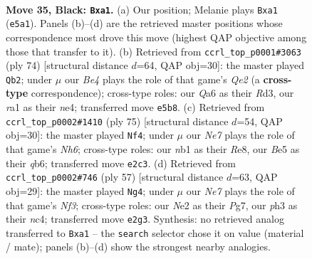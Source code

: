 \documentclass[11pt]{article}
\begin{document}
\clearpage

\begin{figure}[p]\centering
\begin{subfigure}{0.46\textwidth}\centering
\resizebox{\linewidth}{!}{%
\newchessgame
\chessboard[
  setfen={r5k1/1p3p2/q5p1/p2pb3/7p/7P/P3nPP1/RN1Q3K b - - 0 35},
  showmover=false,
  pgfstyle=straightmove, color=movearrow, markmove={e5-a1}
]}
\caption{}
\end{subfigure}\hfill
\begin{subfigure}{0.46\textwidth}\centering
\resizebox{\linewidth}{!}{%
\newchessgame
\chessboard[
  setfen={5r1k/p6p/4q3/3NPp2/4n3/1P1R2P1/P3Q2K/8 w - - 1 38},
  showmover=false,
  pgfstyle=straightmove, color=movearrow, markmove={e2-b2}
]}
\caption{}
\end{subfigure}
\\[4pt]
\begin{subfigure}{0.46\textwidth}\centering
\resizebox{\linewidth}{!}{%
\newchessgame
\chessboard[
  setfen={4r3/5pk1/PQp1q3/4p1p1/2P4p/1PB2P1n/K6R/8 b - - 0 38},
  showmover=false,
  pgfstyle=straightmove, color=movearrow, markmove={h3-f4}
]}
\caption{}
\end{subfigure}\hfill
\begin{subfigure}{0.46\textwidth}\centering
\resizebox{\linewidth}{!}{%
\newchessgame
\chessboard[
  setfen={1k6/1pq3p1/p1p2nQ1/8/PPN4r/7P/5PP1/2R4K b - - 2 29},
  showmover=false,
  pgfstyle=straightmove, color=movearrow, markmove={f6-g4}
]}
\caption{}
\end{subfigure}
\caption{\textbf{Move 35, Black: \texttt{Bxa1}.} (a) Our position; Melanie plays \texttt{Bxa1} (\texttt{e5a1}). Panels (b)--(d) are the retrieved master positions whose correspondence most drove this move (highest QAP objective among those that transfer to it). (b) Retrieved from \texttt{ccrl\_top\_p0001\#3063} (ply 74) [structural distance $d$=64, QAP obj=30]: the master played \texttt{Qb2}; under $\mu$ our \emph{Be4} plays the role of that game's \emph{Qe2} (a \textbf{cross-type} correspondence); cross-type roles: our \emph{Q}a6 as their \emph{R}d3, our \emph{r}a1 as their \emph{n}e4; transferred move \texttt{e5b8}. (c) Retrieved from \texttt{ccrl\_top\_p0002\#1410} (ply 75) [structural distance $d$=54, QAP obj=30]: the master played \texttt{Nf4}; under $\mu$ our \emph{Ne7} plays the role of that game's \emph{Nh6}; cross-type roles: our \emph{n}b1 as their \emph{R}e8, our \emph{B}e5 as their \emph{q}b6; transferred move \texttt{e2c3}. (d) Retrieved from \texttt{ccrl\_top\_p0002\#746} (ply 57) [structural distance $d$=63, QAP obj=29]: the master played \texttt{Ng4}; under $\mu$ our \emph{Ne7} plays the role of that game's \emph{Nf3}; cross-type roles: our \emph{N}e2 as their \emph{P}g7, our \emph{p}h3 as their \emph{n}c4; transferred move \texttt{e2g3}. Synthesis: no retrieved analog transferred to \texttt{Bxa1} -- the \texttt{search} selector chose it on value (material / mate); panels (b)--(d) show the strongest nearby analogies.}
\label{fig:thought-m69}
\end{figure}
\end{document}
